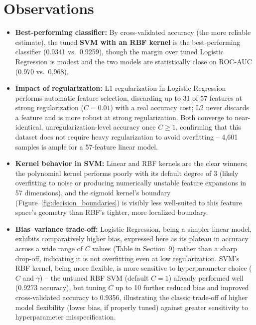 \documentclass[12pt,a4paper]{article}
\DeclareRobustCommand{\_}{\textunderscore\allowbreak}
\begin{document}
\section{Observations}
\begin{itemize}
\item \textbf{Best-performing classifier:} By cross-validated accuracy
(the more reliable estimate), the tuned \textbf{SVM with an RBF kernel}
is the best-performing classifier (0.9341 vs.\ 0.9259), though the margin
over tuned Logistic Regression is modest and the two models are
statistically close on ROC-AUC (0.970 vs.\ 0.968).
\item \textbf{Impact of regularization:} L1 regularization in Logistic
Regression performs automatic feature selection, discarding up to 31 of 57
features at strong regularization ($C=0.01$) with a real accuracy cost;
L2 never discards a feature and is more robust at strong regularization.
Both converge to near-identical, unregularization-level accuracy once
$C\geq 1$, confirming that this dataset does not require heavy
regularization to avoid overfitting -- 4{,}601 samples is ample for a
57-feature linear model.
\item \textbf{Kernel behavior in SVM:} Linear and RBF kernels are the clear
winners; the polynomial kernel performs poorly with its default degree of
3 (likely overfitting to noise or producing numerically unstable feature
expansions in 57 dimensions), and the sigmoid kernel's boundary
(Figure~\ref{fig:decision_boundaries}) is visibly less well-suited to this
feature space's geometry than RBF's tighter, more localized boundary.
\item \textbf{Bias--variance trade-off:} Logistic Regression, being a
simpler linear model, exhibits comparatively higher bias, expressed here as
its plateau in accuracy across a wide range of $C$ values (Table in
Section~9) rather than a sharp drop-off, indicating it is not overfitting
even at low regularization. SVM's RBF kernel, being more flexible, is more
sensitive to hyperparameter choice ($C$ and $\gamma$) -- the untuned RBF SVM
(default $C=1$) already performed well (0.9273 accuracy), but tuning $C$ up
to 10 further reduced bias and improved cross-validated accuracy to 0.9356,
illustrating the classic trade-off of higher model flexibility (lower bias,
if properly tuned) against greater sensitivity to hyperparameter
misspecification.
\end{itemize}
\end{document}
